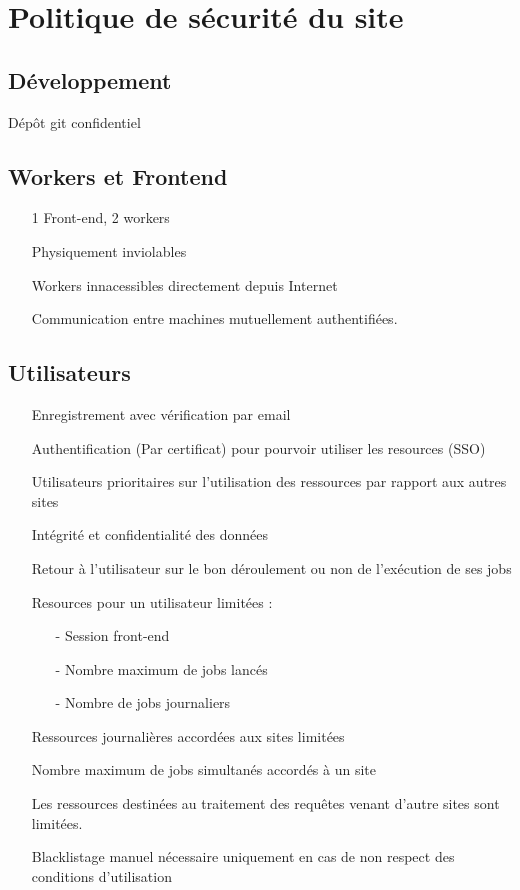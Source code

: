 \newpage

\chapter{Politique de sécurité du site}

\section{Développement}

Dépôt git confidentiel

\section{Workers et Frontend}

\begin{itemize}
\item[\textbullet] 1 Front-end, 2 workers
\item[\textbullet] Physiquement inviolables
\item[\textbullet] Workers innacessibles directement depuis Internet
\item[\textbullet] Communication entre machines mutuellement authentifiées.
\end{itemize}

\section{Utilisateurs}

\begin{itemize}
\item[\textbullet] Enregistrement avec vérification par email
\item[\textbullet] Authentification (Par certificat) pour pourvoir utiliser les resources (SSO)
\item[\textbullet] Utilisateurs prioritaires sur l'utilisation des ressources par rapport aux autres sites
\item[\textbullet] Intégrité et confidentialité des données
\item[\textbullet] Retour à l'utilisateur sur le bon déroulement ou non de l'exécution de ses jobs 
\item[\textbullet] Resources pour un utilisateur limitées :
	\begin{itemize}
	\item[-] Session front-end
	\item[-] Nombre maximum de jobs lancés
	\item[-] Nombre de jobs journaliers
	\end{itemize}
\item[\textbullet] Ressources journalières accordées aux sites limitées
\item[\textbullet] Nombre maximum de jobs simultanés accordés à un site
\item[\textbullet] Les ressources destinées au traitement des requêtes venant d'autre sites sont limitées.
\item[\textbullet]  Blacklistage manuel nécessaire uniquement en cas de non respect des conditions d'utilisation
\end{itemize}
 

